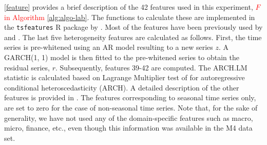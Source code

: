 \documentclass[11pt,a4paper,]{article}
\theoremstyle{definition}
\theoremstyle{definition}
\theoremstyle{definition}
\theoremstyle{remark}
\begin{document}
\autoref{feature} provides a brief description of the 42 features used
in this experiment, \textcolor{red}{$F$ in Algorithm}
\ref{alg:algo-lab}. The functions to calculate these are implemented in
the \texttt{tsfeatures} R package by \textcite{tsfeatures}. Most of the
features have been previously used by \textcite{hyndman2015large} and
\textcite{fforms}. The last five heterogeneity features are calculated
as follows. First, the time series is pre-whitened using an AR model
resulting to a new series \(z\). A GARCH(1, 1) model is then fitted to
the pre-whitened series to obtain the residual series, \(r\).
Subsequently, features 39-42 are computed. The ARCH.LM statistic is
calculated based on Lagrange Multiplier test of
\textcite{engle1982autoregressive} for autoregressive conditional
heteroscedasticity (ARCH). A detailed description of the other features
is provided in \textcite{fforms}. The features corresponding to seasonal
time series only, are set to zero for the case of non-seasonal time
series. Note that, for the sake of generality, we have not used any of
the domain-specific features such as macro, micro, finance, etc., even
though this information was available in the M4 data
set.
\end{document}

